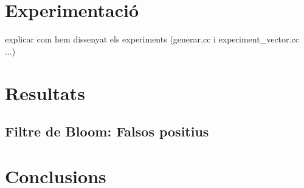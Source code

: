 \documentclass[titlepage]{article}
\begin{document}
\clearpage
\section{Experimentació}
explicar com hem dissenyat els experiments (generar.cc i experiment\_vector.cc ...)

\clearpage
\section{Resultats}
\subsection{Filtre de Bloom: Falsos positius}

\clearpage
\section{Conclusions}

\clearpage
\end{document}
